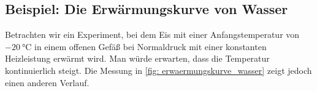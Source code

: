 \subsection{Beispiel: Die Erwärmungskurve von Wasser}\label{subsec: erwaermungskurve_beispiel}
Betrachten wir ein Experiment, bei dem Eis mit einer Anfangstemperatur von $\SI{-20}{\celsius}$ in einem offenen Gefäß bei Normaldruck mit einer konstanten Heizleistung erwärmt wird. Man würde erwarten, dass die Temperatur kontinuierlich steigt. Die Messung in \cref{fig: erwaermungskurve_wasser} zeigt jedoch einen anderen Verlauf.
